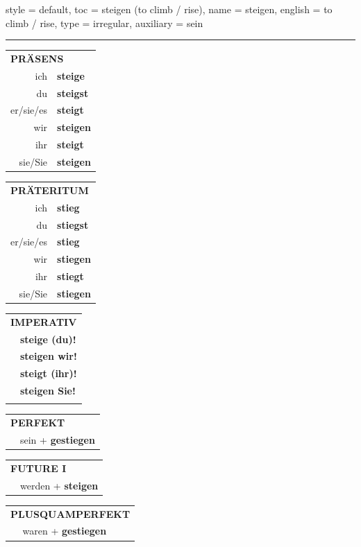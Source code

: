 \begin{verbentry}{
  style = {default},
  toc = {steigen (to climb / rise)},
  name = {steigen},
  english = {to climb / rise},
  type = {irregular},
  auxiliary = {sein}
}
 
    
     \vspace{5pt}

    \hrule
    
    \vspace{5pt}

  \begin{tabular}{rl}
     \multicolumn{2}{l}{\textbf{PRÄSENS} }\\
    ich & \textbf{steige}\\
    du & \textbf{steigst}\\
    er/sie/es & \textbf{steigt}\\
    wir & \textbf{steigen}\\
    ihr & \textbf{steigt}\\
    sie/Sie & \textbf{steigen}\\
  \end{tabular}
  \hfill
  \begin{tabular}{rl}
    \multicolumn{2}{l}{\textbf{PRÄTERITUM} }\\
    ich & \textbf{stieg}\\
    du & \textbf{stiegst}\\
    er/sie/es & \textbf{stieg}\\
    wir & \textbf{stiegen}\\
    ihr & \textbf{stiegt}\\
    sie/Sie & \textbf{stiegen}\\
  \end{tabular}
  \hfill
  \begin{tabular}{rl}
     \multicolumn{2}{l}{\textbf{IMPERATIV} }\\
   & \textbf{steige (du)!}\\
   & \textbf{steigen wir!}\\
   & \textbf{steigt (ihr)!}\\
   & \textbf{steigen Sie!}\\
   & \vspace{10pt}
  \end{tabular}

 \vspace{10pt}

 \begin{tabular}{rl}
     \multicolumn{2}{l}{\textbf{PERFEKT}}\\
   & sein + \textbf{gestiegen}\\
  \end{tabular}
\hfill
\begin{tabular}{rl}
    \multicolumn{2}{l}{\textbf{FUTURE I}}\\
   & werden + \textbf{steigen}\\
  \end{tabular}
\hfill
\begin{tabular}{rl}
    \multicolumn{2}{l}{\textbf{PLUSQUAMPERFEKT}}\\
   & waren + \textbf{gestiegen}\\
  \end{tabular}


\end{verbentry}
